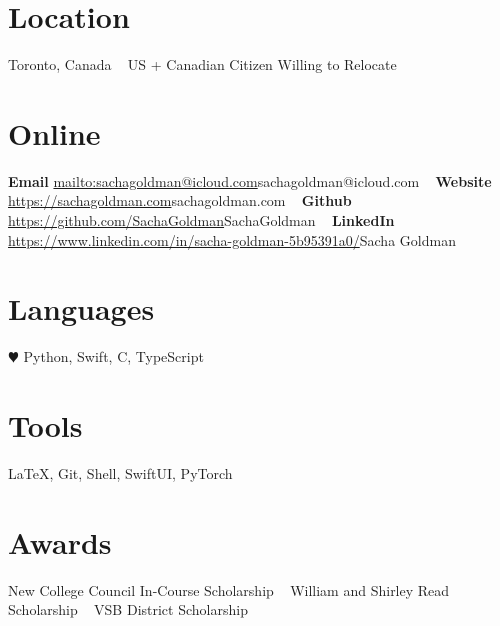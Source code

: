 \documentclass[]{style}
\begin{document}


\begin{aside} %
\section{Location}
Toronto, Canada
~ \vspace{-2mm}
US + Canadian Citizen 
Willing to Relocate
~ \vspace{-2mm}
\section{Online}
\textbf{Email}
\url{mailto:sachagoldman@icloud.com}{sachagoldman@icloud.com} 
~ \vspace{-2mm}
\textbf{Website} 
\url{https://sachagoldman.com}{sachagoldman.com} 
~ \vspace{-2mm}
\textbf{Github}
\url{https://github.com/SachaGoldman}{SachaGoldman}
~ \vspace{-2mm}
\textbf{LinkedIn}
\url{https://www.linkedin.com/in/sacha-goldman-5b95391a0/}{Sacha Goldman}
\section{Languages}
{\color{red} $\varheartsuit$} Python, Swift, 
C, TypeScript
\section{Tools}
\LaTeX, Git, Shell, 
SwiftUI, PyTorch
\section{Awards}
New College Council 
In-Course Scholarship
~ \vspace{-1mm}
William and Shirley Read 
Scholarship
~ \vspace{-1mm}
VSB District Scholarship
\end{aside}

\end{document}
